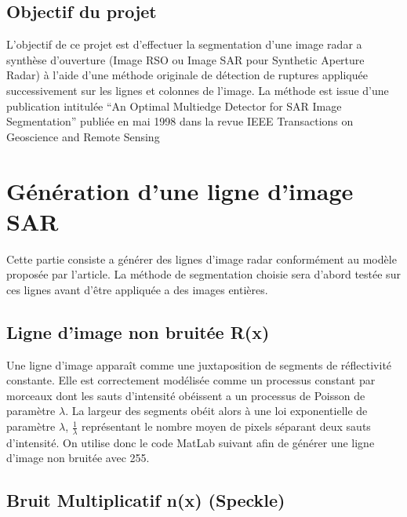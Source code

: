 \documentclass[a4paper,11pt]{article}
\newcommand{\FSource}[1]{%
  
  }
\begin{document}
\subsection{Objectif du projet}

L'objectif de ce projet est d'effectuer la segmentation d'une image radar a synthèse d'ouverture (Image RSO ou Image SAR pour Synthetic Aperture Radar) à l'aide d'une méthode originale de détection de
ruptures appliquée successivement sur les lignes et colonnes de l'image. La méthode
est issue d'une publication intitulée “An Optimal Multiedge Detector for SAR Image
Segmentation” publiée en mai 1998 dans la revue IEEE Transactions on Geoscience
and Remote Sensing

\newpage

\section{Génération d'une ligne d'image SAR}

Cette partie consiste a générer des lignes d'image radar conformément au modèle proposée par l'article. La méthode de segmentation choisie sera d'abord testée sur ces lignes
avant d'être appliquée a des images entières.

\subsection{Ligne d'image non bruitée R(x)}

Une ligne d'image apparaît comme une juxtaposition de segments de réflectivité constante.
Elle est correctement modélisée comme un processus constant par morceaux dont les
sauts d'intensité obéissent a un processus de Poisson de paramètre $\lambda$. La
largeur des segments obéit alors à une loi exponentielle de paramètre $\lambda$, $\frac{1}{\lambda}$ représentant
le nombre moyen de pixels séparant deux sauts d'intensité. On utilise donc le code MatLab suivant afin de générer une ligne d'image non bruitée avec 255.

\vspace{0.5cm}

\FSource{matlab/1.m}

\vspace{0.5cm}


\subsection{Bruit Multiplicatif n(x) (Speckle)}
\end{document}
